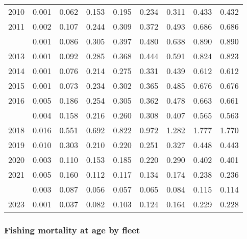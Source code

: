 \documentclass[
]{article}
\begin{document}
\begin{longtable}[t]{lrrrrrrrr}
2010 & 0.001 & 0.062 & 0.153 & 0.195 & 0.234 & 0.311 & 0.433 & 0.432\\
2011 & 0.002 & 0.107 & 0.244 & 0.309 & 0.372 & 0.493 & 0.686 & 0.686\\
\addlinespace
2012 & 0.001 & 0.086 & 0.305 & 0.397 & 0.480 & 0.638 & 0.890 & 0.890\\
2013 & 0.001 & 0.092 & 0.285 & 0.368 & 0.444 & 0.591 & 0.824 & 0.823\\
2014 & 0.001 & 0.076 & 0.214 & 0.275 & 0.331 & 0.439 & 0.612 & 0.612\\
2015 & 0.001 & 0.073 & 0.234 & 0.302 & 0.365 & 0.485 & 0.676 & 0.676\\
2016 & 0.005 & 0.186 & 0.254 & 0.305 & 0.362 & 0.478 & 0.663 & 0.661\\
\addlinespace
2017 & 0.004 & 0.158 & 0.216 & 0.260 & 0.308 & 0.407 & 0.565 & 0.563\\
2018 & 0.016 & 0.551 & 0.692 & 0.822 & 0.972 & 1.282 & 1.777 & 1.770\\
2019 & 0.010 & 0.303 & 0.210 & 0.220 & 0.251 & 0.327 & 0.448 & 0.443\\
2020 & 0.003 & 0.110 & 0.153 & 0.185 & 0.220 & 0.290 & 0.402 & 0.401\\
2021 & 0.005 & 0.160 & 0.112 & 0.117 & 0.134 & 0.174 & 0.238 & 0.236\\
\addlinespace
2022 & 0.003 & 0.087 & 0.056 & 0.057 & 0.065 & 0.084 & 0.115 & 0.114\\
2023 & 0.001 & 0.037 & 0.082 & 0.103 & 0.124 & 0.164 & 0.229 & 0.228\\*
\end{longtable}

\subsubsection{Fishing mortality at age by
fleet}\label{fishing-mortality-at-age-by-fleet}
\end{document}
